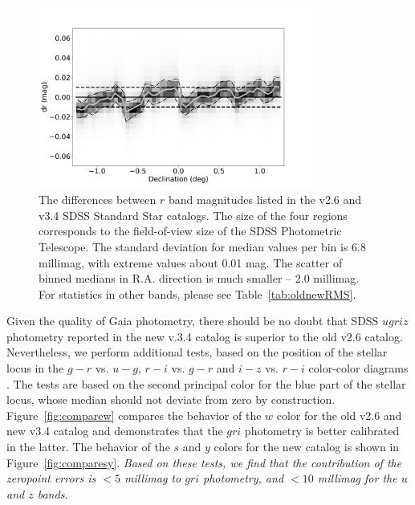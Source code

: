\begin{figure}[th!]
    \centering\includegraphics[width=9cm]{figures/testV26vsV33_r_dr_Dec_Hess.png} 
\caption{The differences between $r$ band magnitudes listed in the v2.6 and v3.4 
    SDSS Standard Star catalogs. The size of the four regions corresponds to the
field-of-view size of the SDSS Photometric Telescope. The standard 
deviation for median values per bin is 6.8 millimag, with extreme values about 0.01 mag. 
The scatter of binned medians in R.A. direction is much smaller -- 2.0 millimag. 
For statistics in other bands, please see Table~\ref{tab:oldnewRMS}.}
\label{fig:v26v34drDec}
\end{figure}
 


Given the quality of Gaia photometry, there should be no doubt that SDSS $ugriz$ photometry
reported in the new v.3.4 catalog is superior to the old v2.6 catalog. Nevertheless, we perform
additional tests, based on the position of the stellar locus in the $g-r$ vs. $u-g$, $r-i$ vs. $g-r$ 
and $i-z$ vs. $r-i$ color-color diagrams  \citep{2004AN....325..583I}. The tests are based
on the second principal color for the blue part of the stellar locus, whose median should 
not deviate from zero by construction. Figure~\ref{fig:comparew} compares the behavior
of the $w$ color for the old v2.6 and new v3.4 catalog and demonstrates that the $gri$
photometry is better calibrated in the latter. The behavior of the $s$ and $y$ colors for the 
new catalog is shown in Figure~\ref{fig:comparesy}. {\it Based on these tests, we find that 
the contribution of the zeropoint errors is $<5$ millimag to $gri$ photometry, and 
$<10$ millimag for the $u$ and $z$ bands.} 



